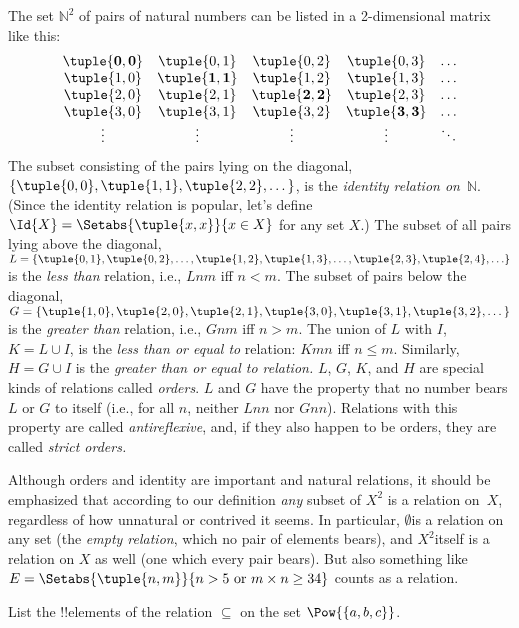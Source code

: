 \documentclass[../../include/open-logic-section]{subfiles}
\begin{document}
\begin{ex}
The set $\mathbb{N}^{2}$ of
pairs of natural numbers can be listed in a 2-dimensional matrix like
this:
\[
\begin{array}{ccccc}
\mathbf{\tuple{ 0,0 }} & \tuple{ 0,1 } & 
  \tuple{ 0,2 } & \tuple{ 0,3 } & \ldots\\ 
\tuple{ 1,0 } & \mathbf{\tuple{ 1,1 }} & 
  \tuple{ 1,2 } & \tuple{ 1,3 } & \ldots\\ 
\tuple{ 2,0 } & \tuple{ 2,1 } & 
  \mathbf{\tuple{ 2,2 }} & \tuple{ 2,3 } & \ldots\\ 
\tuple{ 3,0 } & \tuple{ 3,1 } & \tuple{ 3,2 } &
  \mathbf{\tuple{ 3,3 }} & \ldots\\ 
\vdots & \vdots & \vdots & \vdots & \mathbf{\ddots}
\end{array}
\]
The subset consisting of the pairs lying on the diagonal, $\{\tuple{
0,0 }, \tuple{ 1,1 }, \tuple{ 2,2 }, \dots\}$, is the
\emph{identity relation on}~$\mathbb{N}$. (Since the identity
relation is popular, let's define $\Id{X}=\Setabs{\tuple{ x,x }}{x \in
X}$ for any set $X$.) The subset of all pairs lying above the
diagonal, $L = \{\tuple{ 0,1 },\tuple{ 0,2 },\ldots,\tuple{
1,2 }, \tuple{ 1,3 }, \dots, \tuple{ 2,3 }, \tuple{ 2,4
},\ldots\}$ is the \emph{less than} relation, i.e., $Lnm$ iff
$n<m$. The subset of pairs below the diagonal, $G=\{ \tuple{ 1,0
},\tuple{ 2,0 },\tuple{ 2,1 }, \tuple{ 3,0
},\tuple{ 3,1 },\tuple{ 3,2 }, \dots\}$ is the
\emph{greater than} relation, i.e., $Gnm$ iff $n>m$. The union of $L$
with $I$, $K=L\cup I$, is the \emph{less than or equal to} relation:
$Kmn$ iff $n\le m$. Similarly, $H=G\cup I$ is the \emph{greater than
  or equal to relation.} $L$, $G$, $K$, and $H$ are special kinds of
relations called \emph{orders}. $L$ and $G$ have the property that no
number bears $L$ or $G$ to itself (i.e., for all $n$, neither $Lnn$
nor $Gnn$). Relations with this property are called
\emph{antireflexive}, and, if they also happen to be orders, they are
called \emph{strict orders.}
\end{ex}

\begin{explain}
Although orders and identity are important and natural relations, it
should be emphasized that according to our definition \emph{any}
subset of $X^{2}$ is a relation on~$X$, regardless of how unnatural or
contrived it seems. In particular, $\emptyset$is a relation on any set
(the \emph{empty relation}, which no pair of elements bears), and
$X^{2}$itself is a relation on $X$ as well (one which every pair
bears). But also something like $E=\Setabs{\tuple{n, m}}{n>5 \text{ or
  } m \times n \ge 34}$ counts as a relation.
\end{explain}

\begin{prob}
List the !!{element}s of the relation $\subseteq$ on the set
$\Pow{\{a, b, c\}}$.
\end{prob}
\end{document}
